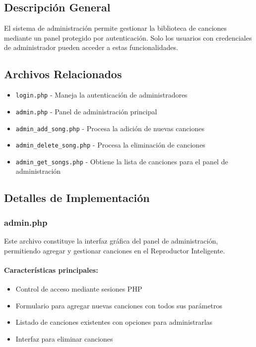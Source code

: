 \documentclass[a4paper,12pt]{article}
\begin{document}
\subsection{Descripción General}
El sistema de administración permite gestionar la biblioteca de canciones mediante un panel protegido por autenticación. Solo los usuarios con credenciales de administrador pueden acceder a estas funcionalidades.

\subsection{Archivos Relacionados}
\begin{itemize}
    \item \texttt{login.php} - Maneja la autenticación de administradores
    \item \texttt{admin.php} - Panel de administración principal
    \item \texttt{admin\_add\_song.php} - Procesa la adición de nuevas canciones
    \item \texttt{admin\_delete\_song.php} - Procesa la eliminación de canciones
    \item \texttt{admin\_get\_songs.php} - Obtiene la lista de canciones para el panel de administración
\end{itemize}

\subsection{Detalles de Implementación}
\subsubsection{admin.php}
Este archivo constituye la interfaz gráfica del panel de administración, permitiendo agregar y gestionar canciones en el Reproductor Inteligente.

\paragraph{Características principales:}
\begin{itemize}
    \item Control de acceso mediante sesiones PHP
    \item Formulario para agregar nuevas canciones con todos sus parámetros
    \item Listado de canciones existentes con opciones para administrarlas
    \item Interfaz para eliminar canciones
\end{itemize}
\end{document}
